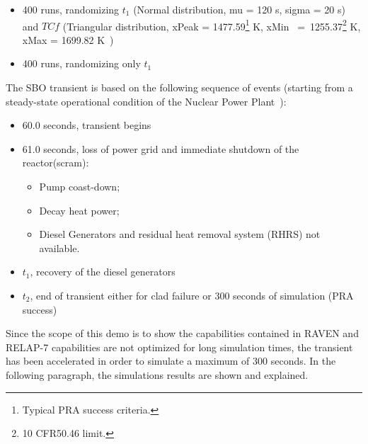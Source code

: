 \documentclass{mc2013}
\begin{document}
 \begin{itemize}
   \item 400 runs, randomizing $t_{1}$ (Normal distribution, mu = 120 s, sigma = 20 s) and $TC{f}$ (Triangular distribution, xPeak = 1477.59\footnote{Typical PRA success criteria.} K, xMin~ =~1255.37\footnote{10 CFR50.46 limit.} K, xMax = 1699.82 K~\cite{Urbanic1978})
   \item 400 runs, randomizing only $t_{1}$
\end{itemize}
The SBO transient is based on the following sequence of events (starting from a steady-state operational condition of the Nuclear Power Plant~\cite{relap7FY12}):
 \begin{itemize}
   \item 60.0 seconds, transient begins
   \item 61.0 seconds, loss of power grid and immediate shutdown of the reactor(scram):
   \begin{itemize}
       \item Pump coast-down;  
       \item Decay heat power;
       \item Diesel Generators and residual heat removal system (RHRS) not available. 
    \end{itemize}
   \item $t_{1}$, recovery of the diesel generators
   \item $t_{2}$, end of transient either for clad failure or 300 seconds of simulation (PRA success)
\end{itemize}
Since the scope of this demo is to show the capabilities contained in RAVEN and RELAP-7 capabilities are not optimized for long simulation times, the transient has been accelerated in order to simulate a maximum of 300 seconds. 
In the following paragraph, the simulations results are shown and explained.
\end{document}
